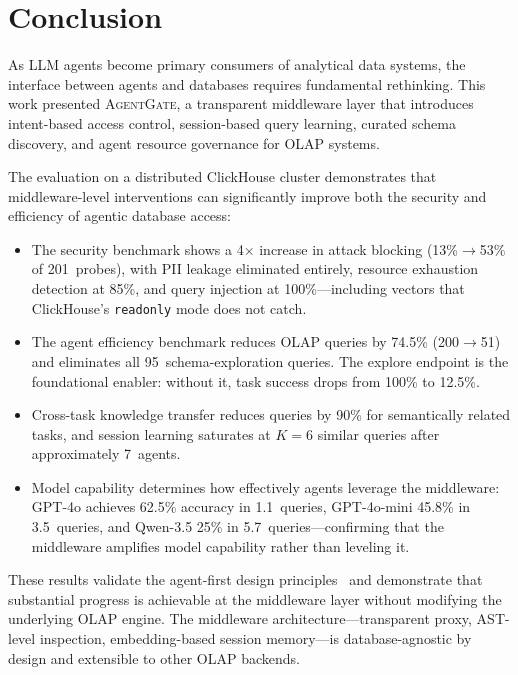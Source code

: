 \documentclass[sigconf, nonacm]{acmart}
\newcommand{\sysname}{\textsc{AgentGate}\xspace}  %
\begin{document}
\section{Conclusion}
\label{sec:conclusion}

As LLM agents become primary consumers of analytical data systems, the
interface between agents and databases requires fundamental rethinking.
This work presented \sysname, a transparent middleware layer that introduces
intent-based access control, session-based query learning, curated schema
discovery, and agent resource governance for OLAP systems.

The evaluation on a distributed ClickHouse cluster demonstrates that
middleware-level interventions can significantly improve both the security
and efficiency of agentic database access:

\begin{itemize}[leftmargin=*]
  \item The security benchmark shows a 4$\times$ increase in attack
        blocking (13\%$\to$53\% of 201~probes), with PII leakage eliminated
        entirely, resource exhaustion detection at 85\%, and query injection
        at 100\%---including vectors that ClickHouse's \texttt{readonly}
        mode does not catch.

  \item The agent efficiency benchmark reduces OLAP queries by 74.5\%
        (200$\to$51) and eliminates all 95~schema-exploration queries.
        The explore endpoint is the foundational enabler: without it,
        task success drops from 100\% to 12.5\%.

  \item Cross-task knowledge transfer reduces queries by 90\% for
        semantically related tasks, and session learning saturates at
        $K{=}6$ similar queries after approximately 7~agents.

  \item Model capability determines how effectively agents leverage the
        middleware: GPT-4o achieves 62.5\% accuracy in 1.1~queries,
        GPT-4o-mini 45.8\% in 3.5~queries, and Qwen-3.5 25\% in
        5.7~queries---confirming that the middleware amplifies model
        capability rather than leveling it.
\end{itemize}

These results validate the agent-first design
principles~\cite{liu2025sao} and demonstrate that substantial progress
is achievable at the middleware layer without modifying the underlying
OLAP engine.  The middleware architecture---transparent proxy, AST-level
inspection, embedding-based session memory---is database-agnostic by
design and extensible to other OLAP backends.



\end{document}

